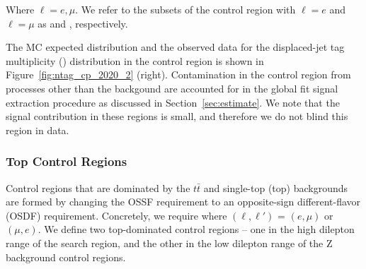 Where $\ell = e, \mu$. We refer to the subsets of the control region with
$\ell = e$ and $\ell = \mu$ as \twoeledy and \twomudy, respectively.

The MC expected distribution and the observed data for the displaced-jet
 tag multiplicity (\NTAGS) distribution in the \twolldy control region is shown in Figure~\ref{fig:ntag_cp_2020_2} 
(right).
Contamination in the control region from processes other than the \Z backgound are
accounted for in the global fit signal extraction procedure as discussed in Section~\ref{sec:estimate}.
We note that the signal contribution in these regions is small,
and therefore we do not blind this region in data.




\subsubsection{Top Control Regions}

Control regions that are dominated by the $t\bar{t}$ and single-top (top) backgrounds are formed
by changing the OSSF requirement to an opposite-sign different-flavor (OSDF) requirement.
Concretely, we require \emu where $(\ell,\ell')$ = $(e,\mu)$ or $(\mu,e)$.
We define two top-dominated control regions -- one in the high dilepton \pt range of the search region,
and the other in the low dilepton \pt range of the Z background control regions.

